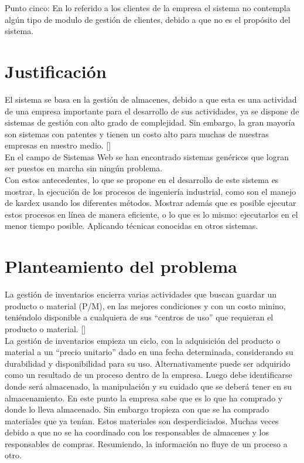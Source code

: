 Punto cinco: En  lo referido a los clientes de la empresa el sistema no contempla algún tipo de modulo de gestión de clientes, debido a que no es el propósito del sistema.\\

\section{Justificación}

El sistema se basa en la gestión de almacenes, debido a que esta es una actividad de una empresa importante para el desarrollo de sus actividades, ya se dispone de sistemas de gestión con alto grado de complejidad. Sin embargo, la gran mayoría son sistemas con patentes y tienen un costo alto para muchas de nuestras empresas en nuestro medio. [\citep{UDL:2019:Online}]\\

En el campo de Sistemas Web se han encontrado sistemas genéricos que logran ser puestos en marcha sin ningún problema.\\

Con estos antecedentes, lo que se propone en el desarrollo de este sistema es mostrar, la ejecución de los procesos de ingeniería industrial, como son el manejo de kardex usando los diferentes métodos. Mostrar además que es posible ejecutar estos procesos en línea de manera eficiente, o lo que es lo mismo: ejecutarlos en el menor tiempo posible. Aplicando técnicas conocidas en otros sistemas.\\


\section{Planteamiento del problema}

La gestión de inventarios encierra varias actividades que buscan guardar un producto o material (P/M), en las mejores condiciones y con un costo minino, teniéndolo disponible a cualquiera de sus “centros de uso” que requieran el producto o material. [\citep{PMA:2019:Online}]\\

La gestión de inventarios empieza un ciclo, con la adquisición del producto o material a un “precio unitario” dado en una fecha determinada, considerando su durabilidad y disponibilidad para su uso. Alternativamente puede ser adquirido como un resultado de un proceso dentro de la empresa. Luego debe identificarse donde será almacenado, la manipulación y su cuidado que se deberá tener en su almacenamiento. En este punto la empresa sabe que es lo que ha comprado y donde lo lleva almacenado. Sin embargo tropieza con que se ha comprado materiales que ya tenían. Estos materiales son desperdiciados. Muchas veces debido a que no se ha coordinado con los responsables de almacenes y los responsables de compras. Resumiendo, la información no fluye de un proceso a otro.\\

